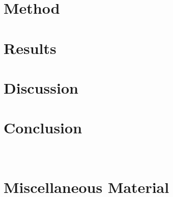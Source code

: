 \documentclass[nofootinbib,reprint,english]{revtex4-1}
\begin{document}
\section{Method}

\section{Results}


\section{Discussion}

\section{Conclusion}

%
%


~
\clearpage
\appendix

\onecolumngrid
\section{Miscellaneous Material}\label{app:misc_material}
\end{document}
